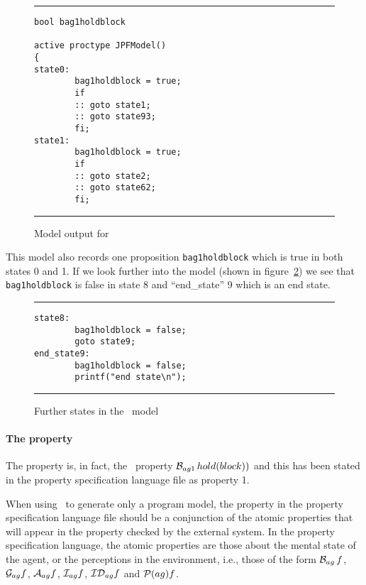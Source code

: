 \documentclass[a4]{article}
\begin{document}
\begin{figure}[htb]
\noindent\rule{\textwidth}{1pt}
\begin{small}
\begin{verbatim}
bool bag1holdblock

active proctype JPFModel()
{
state0:
        bag1holdblock = true;
        if
        :: goto state1;
        :: goto state93;
        fi;
state1:
        bag1holdblock = true;
        if
        :: goto state2;
        :: goto state62;
        fi;
\end{verbatim}
\end{small}
\rule{\textwidth}{1pt}
\caption{Model output for \spin}
\label{fig:spin_output}
\end{figure}


This model also records one proposition \texttt{bag1holdblock} which is true in both states 0 and 1. If we look further into the model (shown in figure~\ref{fig:spin_output2}) we see that \texttt{bag1holdblock} is false in state 8 and ``end_state'' 9 which is an end state.


\begin{figure}[htb]
\noindent\rule{\textwidth}{1pt}
\begin{small}
\begin{verbatim}
state8:
        bag1holdblock = false;
        goto state9;
end_state9:
        bag1holdblock = false;
        printf("end state\n");
\end{verbatim}
\end{small}
\rule{\textwidth}{1pt}
\caption{Further states in the \spin\ model}
\label{fig:spin_output2}
\end{figure}

\paragraph{The property} The property is, in fact, the \ajpf\ property $\mathrm{{\cal B}}_{ag1} \, hold(block))$ and this has been stated in the property specification language file as property 1.  

When using \ajpf\ to generate only a program model, the property in the property specification language file should be a conjunction of the atomic properties that will appear in the property checked by the external system.  In the property specification language, the atomic properties are those about the mental state of the agent, or the perceptions in the environment, i.e., those of the form $\mathrm{{\cal B}}_{ag} \, f$, $\mathrm{{\cal G}}_{ag} f$, $\mathrm{{\cal A}}_{ag} f$, $\mathrm{{\cal I}}_{ag} f$, $\mathrm{{\cal ID}}_{ag} f$ and $\mathrm{{\cal P}}(ag){f}$.
\end{document}
